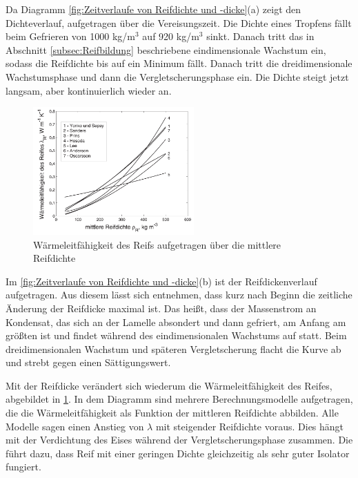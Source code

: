 Da Diagramm \ref{fig:Zeitverlaufe von Reifdichte und -dicke}(a) zeigt den Dichteverlauf, aufgetragen über die Vereisungszeit. Die Dichte eines Tropfens fällt beim Gefrieren von 1000 kg/m$^3$ auf 920 kg/m$^3$ sinkt. Danach tritt das in Abschnitt \ref{subsec:Reifbildung} beschriebene eindimensionale Wachstum ein, sodass die Reifdichte bis auf ein Minimum fällt. Danach tritt die dreidimensionale Wachstumsphase und dann die Vergletscherungsphase ein. Die Dichte  steigt jetzt langsam, aber kontinuierlich wieder an.

\begin{figure}[htb]
\centering	
\includegraphics[width=0.55\textwidth]{Pictures/Waermeleitfaehigkeit_Schydlo.png}
\caption{Wärmeleitfähigkeit des Reifs aufgetragen über die mittlere Reifdichte \citep{Schydlo2010}}
\label{fig:Waermeleitfaehigkeit}
\end{figure}

Im \ref{fig:Zeitverlaufe von Reifdichte und -dicke}(b) ist der Reifdickenverlauf aufgetragen. Aus diesem lässt sich entnehmen, dass kurz nach Beginn die zeitliche Änderung der Reifdicke maximal ist. Das heißt, dass der Massenstrom an Kondensat, das sich an der Lamelle absondert und dann gefriert, am Anfang am größten ist und findet während des eindimensionalen Wachstums auf statt. Beim dreidimensionalen Wachstum und späteren Vergletscherung flacht die Kurve ab und strebt gegen einen Sättigungswert. 


 
Mit der Reifdicke verändert sich wiederum die Wärmeleitfähigkeit des Reifes, abgebildet in \ref{fig:Waermeleitfaehigkeit}. In dem Diagramm sind mehrere Berechnungsmodelle aufgetragen, die die Wärmeleitfähigkeit als Funktion der mittleren Reifdichte abbilden. Alle Modelle sagen einen Anstieg von $\lambda$ mit steigender Reifdichte voraus. Dies hängt mit der Verdichtung des Eises während der Vergletscherungsphase zusammen. Die führt dazu, dass Reif mit einer geringen Dichte gleichzeitig als sehr guter Isolator fungiert. \citep{Baehr2013}  \citep{Kosowski2009}


